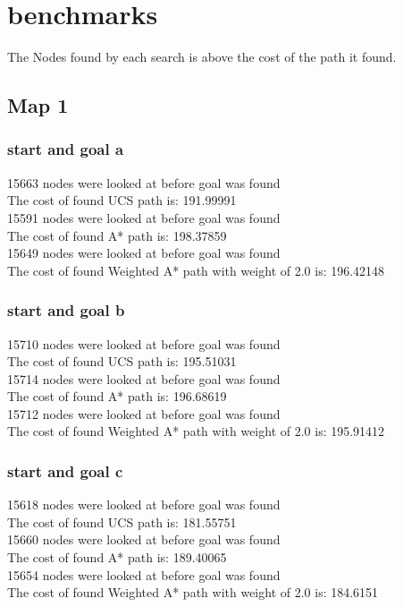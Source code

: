 \documentclass[11pt]{article} %
\begin{document}
\section{benchmarks}
The Nodes found by each search is above the cost of the path it found.
\subsection{Map 1}
\subsubsection{start and goal a}
15663 nodes were looked at before goal was found\\
The cost of found UCS path is: 191.99991\\
15591 nodes were looked at before goal was found\\
The cost of found A* path is: 198.37859\\
15649 nodes were looked at before goal was found\\
The cost of found Weighted A* path with weight of 2.0 is: 196.42148
\subsubsection{start and goal b}
15710 nodes were looked at before goal was found\\
The cost of found UCS path is: 195.51031\\
15714 nodes were looked at before goal was found\\
The cost of found A* path is: 196.68619\\
15712 nodes were looked at before goal was found\\
The cost of found Weighted A* path with weight of 2.0 is: 195.91412\\
\subsubsection{start and goal c}
15618 nodes were looked at before goal was found\\
The cost of found UCS path is: 181.55751\\
15660 nodes were looked at before goal was found\\
The cost of found A* path is: 189.40065\\
15654 nodes were looked at before goal was found\\
The cost of found Weighted A* path with weight of 2.0 is: 184.6151\\
\end{document}
